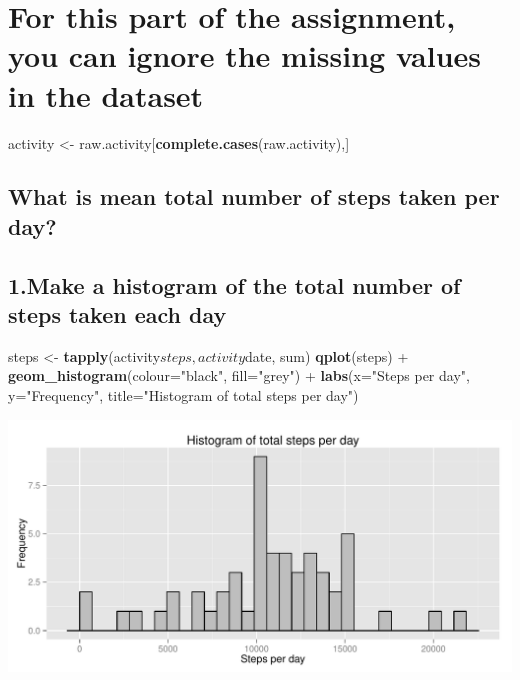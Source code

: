 \documentclass[]{article}
\newenvironment{Shaded}{\begin{snugshade}}{\end{snugshade}}
\newcommand{\KeywordTok}[1]{\textcolor[rgb]{0.13,0.29,0.53}{\textbf{{#1}}}}
\newcommand{\DataTypeTok}[1]{\textcolor[rgb]{0.13,0.29,0.53}{{#1}}}
\newcommand{\StringTok}[1]{\textcolor[rgb]{0.31,0.60,0.02}{{#1}}}
\newcommand{\NormalTok}[1]{{#1}}
\begin{document}
\section{For this part of the assignment, you can ignore the missing
values in the
dataset}\label{for-this-part-of-the-assignment-you-can-ignore-the-missing-values-in-the-dataset}

\begin{Shaded}
\begin{Highlighting}[]
\NormalTok{activity <-}\StringTok{ }\NormalTok{raw.activity[}\KeywordTok{complete.cases}\NormalTok{(raw.activity),]  }
\end{Highlighting}
\end{Shaded}

\subsection{What is mean total number of steps taken per
day?}\label{what-is-mean-total-number-of-steps-taken-per-day-1}

\subsection{1.Make a histogram of the total number of steps taken each
day}\label{make-a-histogram-of-the-total-number-of-steps-taken-each-day}

\begin{Shaded}
\begin{Highlighting}[]
\NormalTok{steps <-}\StringTok{ }\KeywordTok{tapply}\NormalTok{(activity$steps, activity$date, sum)}
\KeywordTok{qplot}\NormalTok{(steps) +}\StringTok{ }\KeywordTok{geom_histogram}\NormalTok{(}\DataTypeTok{colour=}\StringTok{"black"}\NormalTok{, }\DataTypeTok{fill=}\StringTok{"grey"}\NormalTok{) +}\StringTok{ }
\StringTok{  }\KeywordTok{labs}\NormalTok{(}\DataTypeTok{x=}\StringTok{"Steps per day"}\NormalTok{, }\DataTypeTok{y=}\StringTok{"Frequency"}\NormalTok{, }\DataTypeTok{title=}\StringTok{"Histogram of total steps per day"}\NormalTok{)}
\end{Highlighting}
\end{Shaded}

\includegraphics{PA1_template_files/figure-latex/unnamed-chunk-3-1.pdf}
\end{document}

